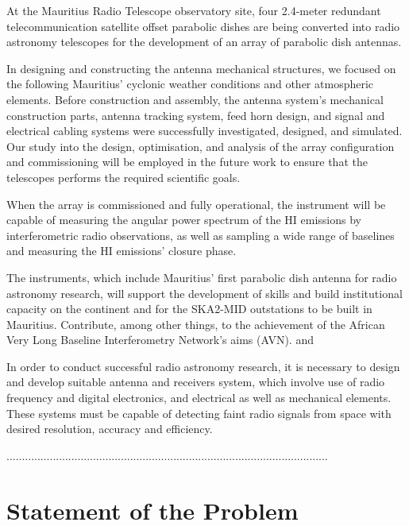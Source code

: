 {At the Mauritius Radio Telescope observatory site, four 2.4-meter redundant telecommunication satellite offset parabolic dishes are being converted into radio astronomy telescopes for the development of an array of parabolic dish antennas.

In designing and constructing the antenna mechanical structures, we focused on the following Mauritius' cyclonic weather conditions and other atmospheric elements.
Before construction and assembly, the antenna system's mechanical construction parts, antenna tracking system, feed horn design, and signal and electrical cabling systems were successfully investigated, designed, and simulated.
Our study into the design, optimisation, and analysis of the array configuration and commissioning will be employed in the future work to ensure that the telescopes performs  the required scientific goals.


When the array is commissioned and fully operational, the instrument will be capable of measuring the angular power spectrum of the HI emissions by interferometric radio observations, as well as sampling a wide range of baselines and measuring the HI emissions' closure phase.


The instruments, which include Mauritius' first parabolic dish antenna for radio astronomy research, will support the development of skills and build institutional capacity on the continent and for the SKA2-MID outstations to be built in Mauritius. Contribute, among other things, to the achievement of the African Very Long Baseline Interferometry Network's aims (AVN).
\cite{copley2016african} and \cite{sharpe2021sarao}


In order to conduct successful radio astronomy research, it is necessary to design and develop suitable antenna and receivers system, which involve use of radio frequency and digital electronics, and electrical as well as mechanical elements.
These systems must be capable of detecting faint radio signals from space with desired resolution, accuracy and efficiency.

........................................................................................................


\section{Statement of the Problem}



}
